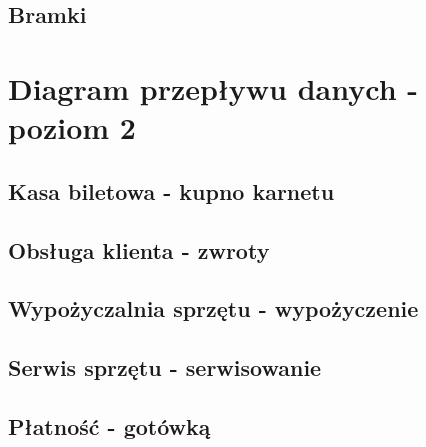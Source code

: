 \documentclass{sprawozdanie-agh}
\begin{document}
\begin{landscape}
	\newpage
	\subsection{Bramki}
	\begin{figure}
		
	\end{figure}

	\newpage
	\section{Diagram przepływu danych - poziom 2}
	\subsection{Kasa biletowa - kupno karnetu}
	\begin{figure}
		
	\end{figure}

	\newpage
	\subsection{Obsługa klienta - zwroty}
	\begin{figure}
		
	\end{figure}

	\newpage
	\subsection{Wypożyczalnia sprzętu - wypożyczenie}
	\begin{figure}
		
	\end{figure}

	\newpage
	\subsection{Serwis sprzętu - serwisowanie}
	\begin{figure}
		
	\end{figure}

	\newpage
	\subsection{Płatność - gotówką}
	\begin{figure}
		
	\end{figure}


\end{landscape}
\end{document}
